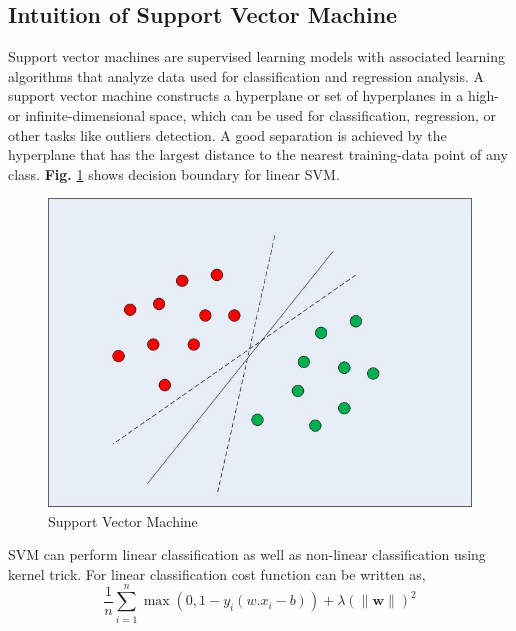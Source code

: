 \subsection{Intuition of Support Vector Machine}
Support vector machines are supervised learning models with associated learning algorithms that analyze data used for classification and regression analysis.  A support vector machine constructs a hyperplane or set of hyperplanes in a high- or infinite-dimensional space, which can be used for classification, regression, or other tasks like outliers detection. A good separation is achieved by the hyperplane that has the largest distance to the nearest training-data point of any class. \textbf{Fig.} \ref{fig:SVM} shows decision boundary for linear SVM.


\begin{figure}[h!]
    \centering
    \includegraphics[scale=0.4]{Figures/svm.png}
    \caption{Support Vector Machine}
    \label{fig:SVM}
\end{figure}

SVM can perform linear classification as well as non-linear classification using kernel trick. For linear classification cost function can be written as,
\begin{equation}
    \label{cost_function_svm}
    \frac{1}{n}\sum_{i=1}^{n}\max{(0,1-y_{i}(w.x_{i}-b))} + \lambda (\lVert \mathbf{w} \rVert)^2
\end{equation}

